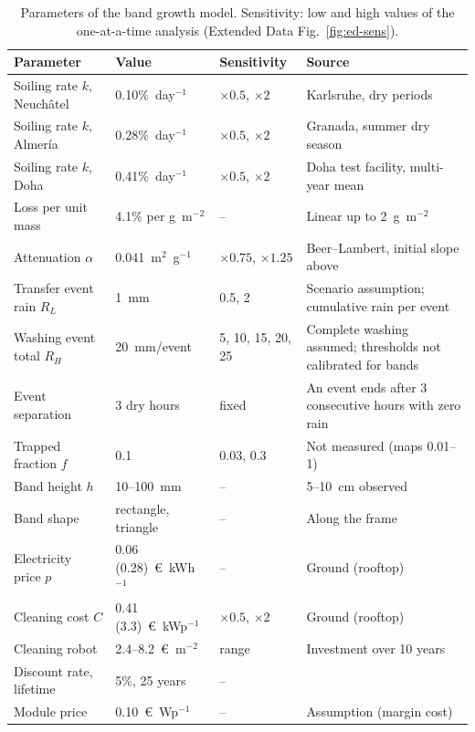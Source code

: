 \begin{table}[!t]
\caption{Parameters of the band growth model. Sensitivity: low and high values of the one-at-a-time analysis (Extended Data Fig.~\ref{fig:ed-sens}).\label{tab:bandparams}}
\begin{tabularx}{\textwidth}{p{3.6cm}p{3.0cm}p{2.3cm}X}
\toprule
\textbf{Parameter} & \textbf{Value} & \textbf{Sensitivity} & \textbf{Source} \\
\midrule
\rowcolor{tabgrey} Soiling rate $k$, Neuch\^atel & 0.10\%~day$^{-1}$ & $\times 0.5$, $\times 2$ & Karlsruhe, dry periods \cite{WorldEnergyMeteorology} \\
Soiling rate $k$, Almer\'ia & 0.28\%~day$^{-1}$ & $\times 0.5$, $\times 2$ & Granada, summer dry season \cite{micheliEconomicsSeasonalPhotovoltaic2021} \\
\rowcolor{tabgrey} Soiling rate $k$, Doha & 0.41\%~day$^{-1}$ & $\times 0.5$, $\times 2$ & Doha test facility, multi-year mean \cite{ahziInvestigationPVSoiling} \\
Loss per unit mass & 4.1\% per g~m$^{-2}$ & -- & Linear up to 2~g~m$^{-2}$ \cite{boyleNaturalSoilingPhotovoltaic2015} \\
\rowcolor{tabgrey} Attenuation $\alpha$ & 0.041~m$^{2}$~g$^{-1}$ & $\times 0.75$, $\times 1.25$ & Beer--Lambert, initial slope above \\
Transfer event rain $R_L$ & 1~mm & 0.5, 2 & Scenario assumption; cumulative rain per event \\
\rowcolor{tabgrey} Washing event total $R_H$ & 20~mm/event & 5, 10, 15, 20, 25 & Complete washing assumed; thresholds not calibrated for bands \\
Event separation & 3 dry hours & fixed & An event ends after 3 consecutive hours with zero rain \\
\rowcolor{tabgrey} Trapped fraction $f$ & 0.1 & 0.03, 0.3 & Not measured (maps 0.01--1) \\
Band height $h$ & 10--100~mm & -- & 5--10~cm observed \cite{yanYao2018} \\
\rowcolor{tabgrey} Band shape & rectangle, triangle & -- & Along the frame \cite{cuiCharacterizationSoilingBands2021a} \\
Electricity price $p$ & 0.06 (0.28)~\euro~kWh$^{-1}$ & -- & Ground (rooftop) \cite{ilseTechnoEconomicAssessmentSoiling2019a} \\
\rowcolor{tabgrey} Cleaning cost $C$ & 0.41 (3.3)~\euro~kWp$^{-1}$ & $\times 0.5$, $\times 2$ & Ground (rooftop) \cite{ilseTechnoEconomicAssessmentSoiling2019a} \\
Cleaning robot & 2.4--8.2~\euro~m$^{-2}$ & range & Investment over 10 years \cite{ilseTechnoEconomicAssessmentSoiling2019a} \\
\rowcolor{tabgrey} Discount rate, lifetime & 5\%, 25 years & -- & \cite{ilseTechnoEconomicAssessmentSoiling2019a} \\
Module price & 0.10~\euro~Wp$^{-1}$ & -- & Assumption (margin cost) \\
\bottomrule
\end{tabularx}
\end{table}
